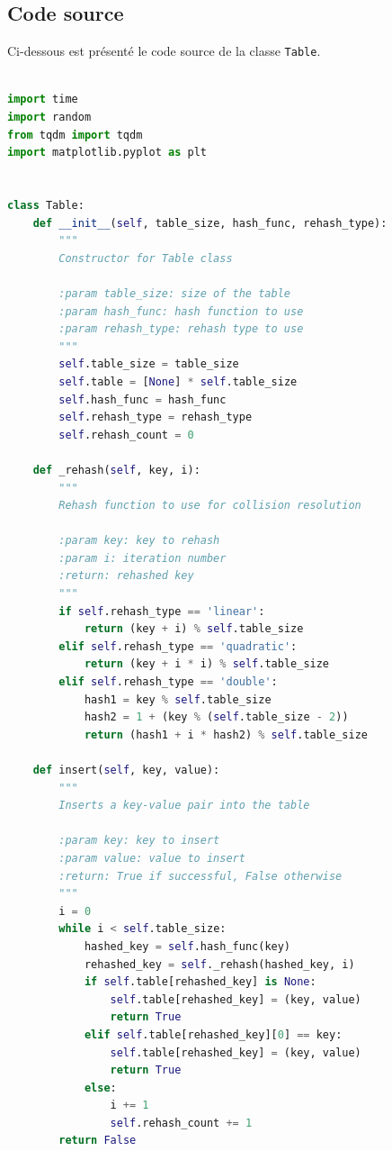 \documentclass{article}
\begin{document}
    \subsection{Code source}\label{subsec:code}

Ci-dessous est présenté le code source de la classe \texttt{Table}.

\begin{lstlisting}[language=Python,label={lst:codesrc}]

import time
import random
from tqdm import tqdm
import matplotlib.pyplot as plt


class Table:
    def __init__(self, table_size, hash_func, rehash_type):
        """
        Constructor for Table class

        :param table_size: size of the table
        :param hash_func: hash function to use
        :param rehash_type: rehash type to use
        """
        self.table_size = table_size
        self.table = [None] * self.table_size
        self.hash_func = hash_func
        self.rehash_type = rehash_type
        self.rehash_count = 0

    def _rehash(self, key, i):
        """
        Rehash function to use for collision resolution

        :param key: key to rehash
        :param i: iteration number
        :return: rehashed key
        """
        if self.rehash_type == 'linear':
            return (key + i) % self.table_size
        elif self.rehash_type == 'quadratic':
            return (key + i * i) % self.table_size
        elif self.rehash_type == 'double':
            hash1 = key % self.table_size
            hash2 = 1 + (key % (self.table_size - 2))
            return (hash1 + i * hash2) % self.table_size

    def insert(self, key, value):
        """
        Inserts a key-value pair into the table

        :param key: key to insert
        :param value: value to insert
        :return: True if successful, False otherwise
        """
        i = 0
        while i < self.table_size:
            hashed_key = self.hash_func(key)
            rehashed_key = self._rehash(hashed_key, i)
            if self.table[rehashed_key] is None:
                self.table[rehashed_key] = (key, value)
                return True
            elif self.table[rehashed_key][0] == key:
                self.table[rehashed_key] = (key, value)
                return True
            else:
                i += 1
                self.rehash_count += 1
        return False


\end{lstlisting}
\end{document}
